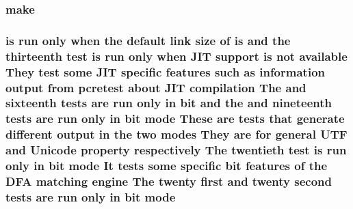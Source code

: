 \subsubsection[{\texorpdfstring{make}{make}}]{\setlength{\rightskip}{0pt plus 5cm}make}\hypertarget{README_8txt_a83fd323c6a07ea419cc41fd2d0f1675b}{}\label{README_8txt_a83fd323c6a07ea419cc41fd2d0f1675b}
\subsubsection[{\texorpdfstring{mode}{mode}}]{ {\bf is} {\bf run} only when the {\bf default} link {\bf size} {\bf of} {\bf is} and the thirteenth test {\bf is} {\bf run} only when J\+IT {\bf support} {\bf is} {\bf not} {\bf available} They test some J\+IT specific {\bf features} such {\bf as} information {\bf output} {\bf from} {\bf pcretest} about J\+IT {\bf compilation} The and sixteenth {\bf tests} {\bf are} {\bf run} only {\bf in} {\bf bit} and the and nineteenth {\bf tests} {\bf are} {\bf run} only {\bf in} {\bf bit} mode These {\bf are} {\bf tests} that generate different {\bf output} {\bf in} the two {\bf modes} They {\bf are} for general U\+TF and {\bf Unicode} property {\bf respectively} The twentieth test {\bf is} {\bf run} only {\bf in} {\bf bit} mode It {\bf tests} some specific {\bf bit} {\bf features} {\bf of} the D\+FA {\bf matching} engine The twenty {\bf first} and twenty {\bf second} {\bf tests} {\bf are} {\bf run} only {\bf in} {\bf bit} mode}\hypertarget{README_8txt_a98cfb2cb75f92750ecb7556a81f00739}{}\label{README_8txt_a98cfb2cb75f92750ecb7556a81f00739}
